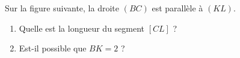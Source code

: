 
\begin{exercice}\label{exo2smath-0090}

    Sur la figure suivante, la droite \( (BC)\) est parallèle à \( (KL)\).
\begin{center}
   
\end{center}

\begin{enumerate}
    \item
        Quelle est la longueur du segment \( [CL]\) ?
    \item
        Est-il possible que \( BK=2\) ?
\end{enumerate}

\end{exercice}
